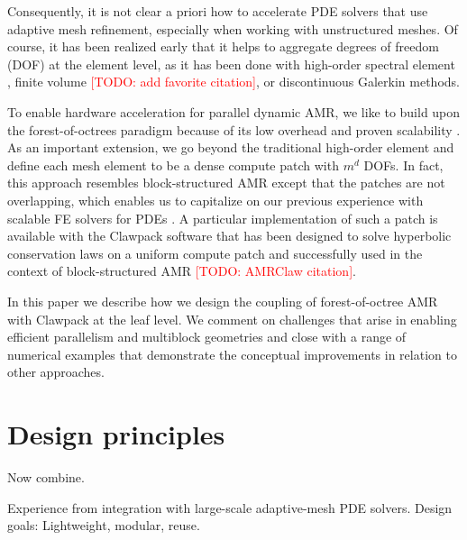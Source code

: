 \documentclass{IOS-Book-Article}     %
\newcommand{\todo}[1]{\textcolor{red}{[TODO: #1]}\xspace}
\begin{document}
Consequently, it is not clear a priori how to accelerate PDE solvers that use
adaptive mesh refinement, especially when working with unstructured meshes.  Of
course, it has been realized early that it helps to aggregate degrees of
freedom (DOF) at the element level, as it has been done with high-order
spectral element \cite{TufoFischer99}, finite volume
\todo{add favorite citation}, or discontinuous Galerkin
\cite{BursteddeGhattasGurnisEtAl10} methods.
%

To enable hardware acceleration for parallel dynamic AMR, we like to build upon
the forest-of-octrees paradigm because of its low overhead and proven
scalability \cite{BursteddeWilcoxGhattas11}.  As an important extension, we go
beyond the traditional high-order element and define each mesh element to be a
dense compute patch with $m^d$ DOFs.  In fact, this approach resembles
block-structured AMR \cite{ColellaGravesKeenEtAl07}
except that the patches are not overlapping, which enables us to capitalize on
our previous experience with scalable FE solvers for PDEs
\cite{BursteddeStadlerAlisicEtAl13}.  A particular implementation of such a
patch is available with the Clawpack software \cite{LeVeque97} that has been
designed to solve hyperbolic conservation laws on a uniform compute patch and
successfully used in the context of block-structured AMR \todo{AMRClaw
citation}.

In this paper we describe how we design the coupling of forest-of-octree AMR
with Clawpack at the leaf level.  We comment on challenges that arise in
enabling efficient parallelism and multiblock geometries and close with a range
of numerical examples that demonstrate the conceptual improvements in relation
to other approaches.

\section*{Design principles}



Now combine.



Experience from integration with large-scale adaptive-mesh PDE solvers.
Design goals: Lightweight, modular, reuse.
\end{document}
